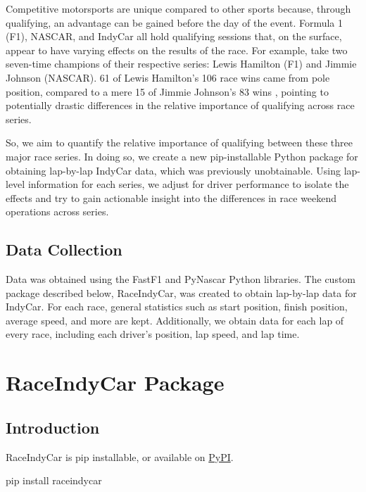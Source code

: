 \documentclass[
  10pt]{article}
\newenvironment{Shaded}{\begin{snugshade}}{\end{snugshade}}
\newcommand{\NormalTok}[1]{\textcolor[rgb]{0.00,0.23,0.31}{#1}}
\begin{document}
Competitive motorsports are unique compared to other sports because,
through qualifying, an advantage can be gained before the day of the
event. Formula 1 (F1), NASCAR, and IndyCar all hold qualifying sessions
that, on the surface, appear to have varying effects on the results of
the race. For example, take two seven-time champions of their respective
series: Lewis Hamilton (F1) and Jimmie Johnson (NASCAR). 61 of Lewis
Hamilton's 106 race wins \citep{statsf1_hamilton} came from pole
position, compared to a mere 15 of Jimmie Johnson's 83 wins
\citep{motorsportstats_johnson}, pointing to potentially drastic
differences in the relative importance of qualifying across race series.

So, we aim to quantify the relative importance of qualifying between
these three major race series. In doing so, we create a new
pip-installable Python package for obtaining lap-by-lap IndyCar data,
which was previously unobtainable. Using lap-level information for each
series, we adjust for driver performance to isolate the effects and try
to gain actionable insight into the differences in race weekend
operations across series.

\subsection{Data Collection}\label{data-collection}

Data was obtained using the FastF1 and PyNascar Python libraries. The
custom package described below, RaceIndyCar, was created to obtain
lap-by-lap data for IndyCar. For each race, general statistics such as
start position, finish position, average speed, and more are kept.
Additionally, we obtain data for each lap of every race, including each
driver's position, lap speed, and lap time.

\section{RaceIndyCar Package}\label{raceindycar-package}

\subsection{Introduction}\label{introduction-1}

RaceIndyCar is pip installable, or available on
\href{https://pypi.org/project/raceindycar}{PyPI}.

\begin{Shaded}
\begin{Highlighting}[]
\NormalTok{pip install raceindycar}
\end{Highlighting}
\end{Shaded}
\end{document}

